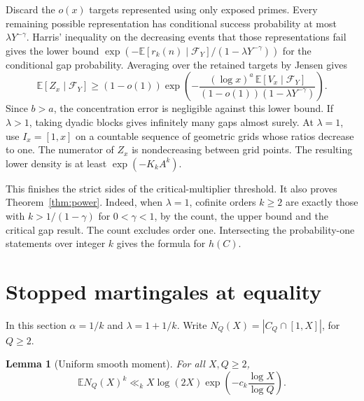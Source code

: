 \documentclass[11pt]{article}
\newtheorem{lemma}{Lemma}[section]
\newcommand{\E}{\mathbb E}
\begin{document}
Discard the \(o(x)\) targets represented using only exposed
primes. Every remaining possible representation has conditional
success probability at most \(\lambda Y^{-\gamma}\).
Harris' inequality on the decreasing events that those
representations fail \cite[formula (3)]{JW} gives the lower
bound \(\exp(-\E[r_k(n)\mid\mathcal F_Y]/(1-\lambda Y^{-\gamma}))\)
for the conditional gap probability. Averaging over the
retained targets by Jensen gives
\[
 \E[Z_x\mid\mathcal F_Y]\ge
 (1-o(1))\exp\!\left(-\frac{(\log x)^a\,\E[V_x\mid\mathcal F_Y]}
                         {(1-o(1))(1-\lambda Y^{-\gamma})}\right).
\]
Since \(b>a\), the concentration error is negligible against
this lower bound. If \(\lambda>1\), taking dyadic blocks gives
infinitely many gaps almost surely. At \(\lambda=1\), use
\(I_x=[1,x]\) on a countable sequence of geometric grids whose
ratios decrease to one. The numerator of \(Z_x\) is
nondecreasing between grid points. The resulting lower density
is at least \(\exp(-K_k A^k)\).

This finishes the strict sides of the critical-multiplier
threshold. It also proves Theorem~\ref{thm:power}. Indeed, when
\(\lambda=1\), cofinite orders \(k\ge2\) are exactly those with
\(k>1/(1-\gamma)\) for \(0<\gamma<1\), by the count, the
upper bound and the critical gap result. The count excludes
order one. Intersecting the probability-one statements over
integer \(k\) gives the formula for \(h(C)\).

\section{Stopped martingales at equality}\label{sec:stopped}

In this section \(\alpha=1/k\) and \(\lambda=1+1/k\).
Write \(N_Q(X)=|C_Q\cap[1,X]|\), for \(Q\ge2\).

\begin{lemma}[Uniform smooth moment]\label{lem:smooth}
For all \(X,Q\ge2\),
\begin{equation}\label{eq:smooth}
    \E N_Q(X)^k\ll_k X\log(2X)
              \exp\!\left(-c_k\frac{\log X}{\log Q}\right).
\end{equation}
\end{lemma}
\end{document}
